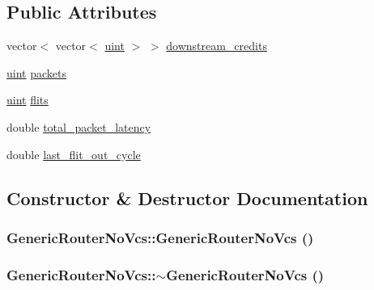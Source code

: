 \subsection*{Public Attributes}
\begin{CompactItemize}
\item 
vector$<$ vector$<$ \hyperlink{outputBuffer_8h_91ad9478d81a7aaf2593e8d9c3d06a14}{uint} $>$ $>$ \hyperlink{classGenericRouterNoVcs_ee50aef2694512a3fdbceca9f5fe8b7e}{downstream\_\-credits}
\item 
\hyperlink{outputBuffer_8h_91ad9478d81a7aaf2593e8d9c3d06a14}{uint} \hyperlink{classGenericRouterNoVcs_dba7f3303be476622b197de24f8b4424}{packets}
\item 
\hyperlink{outputBuffer_8h_91ad9478d81a7aaf2593e8d9c3d06a14}{uint} \hyperlink{classGenericRouterNoVcs_f1f16a8fee993cd6287c8772300c1936}{flits}
\item 
double \hyperlink{classGenericRouterNoVcs_e0c46058ebe12608d9149609ca33e142}{total\_\-packet\_\-latency}
\item 
double \hyperlink{classGenericRouterNoVcs_9dcc34984deb05947a392e063b4eb718}{last\_\-flit\_\-out\_\-cycle}
\end{CompactItemize}


\subsection{Constructor \& Destructor Documentation}
\hypertarget{classGenericRouterNoVcs_0c9d450ec65aa82e1f82d20b3d7c66e1}{
\subsubsection[{GenericRouterNoVcs}]{\setlength{\rightskip}{0pt plus 5cm}GenericRouterNoVcs::GenericRouterNoVcs ()}}
\label{classGenericRouterNoVcs_0c9d450ec65aa82e1f82d20b3d7c66e1}


\hypertarget{classGenericRouterNoVcs_25aa63b54decdffddb9bfd2da7759c4b}{
\subsubsection[{$\sim$GenericRouterNoVcs}]{\setlength{\rightskip}{0pt plus 5cm}GenericRouterNoVcs::$\sim$GenericRouterNoVcs ()}}
\label{classGenericRouterNoVcs_25aa63b54decdffddb9bfd2da7759c4b}



